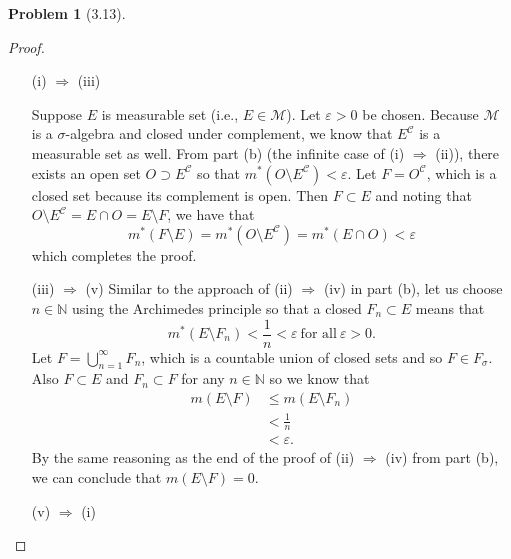 \documentclass[12pt]{article}
\newcommand{\N}{\mathbb{N}}
\newcommand{\C}{\mathscr{C}}
\renewcommand{\epsilon}{\varepsilon}
\theoremstyle{definition}
\newtheorem{problem}{Problem}
\begin{document}
\begin{problem}[3.13]
\begin{enumerate}[label = \alph{*}.]
\begin{proof}
                \begin{enumerate}
                    \item[(i) \( \Rightarrow  \) (iii)] 

                        Suppose \( E \) is measurable set (i.e., \( E \in \mathcal{M} \)). Let \( \epsilon  > 0 \) be chosen. Because \( \mathcal{M} \) is a \( \sigma \)-algebra and closed under complement, we know that \( E^{\C} \) is a measurable set as well. From part (b) (the infinite case of (i) \( \Rightarrow\) (ii)), there exists an open set \( O \supset E^{\C} \) so that \( m^{*}\left( O \setminus E^{\C} \right) < \epsilon \). Let \( F = O^{\C} \), which is a closed set because its complement is open. Then \( F \subset E \) and noting that \( O \setminus E^{\C} = E \cap O = E \setminus F \), we have that 
                            \[
                                m^{*}(F \setminus E ) = m^{*}(O \setminus E^{\C}) = m^{*}(E \cap O) < \epsilon
                            \]
                        which completes the proof. 

                    \item[(iii) \( \Rightarrow \) (v)]
                        Similar to the approach of (ii) \( \Rightarrow \) (iv) in part (b), let us choose \( n \in \N \) using the Archimedes principle so that a closed \( F_n \subset E \) means that 
                            \[
                                 m^{*}(E \setminus F_n) < \frac{1}{n} < \epsilon \ \text{for all} \ \epsilon > 0.
                            \]
                        Let \( \displaystyle F = \bigcup_{n=1}^{\infty} F_n \), which is a countable union of closed sets and so \( F \in F_{\sigma} \). Also \( F \subset E \) and \( F_n \subset F \) for any \( n \in \N \) so we know that
                            \begin{align*}
                                m(E \setminus F) &\leq m(E \setminus F_n) \\
                                                 &< \frac{1}{n} \\
                                                 &< \epsilon.
                            \end{align*}
                        By the same reasoning as the end of the proof of (ii) \( \Rightarrow \) (iv) from part (b), we can conclude that \( m(E \setminus F) = 0 \).


                    \item[(v) \( \Rightarrow \) (i)]   
                    

\end{enumerate}
\end{proof}
\end{enumerate}
\end{problem}
\end{document}
